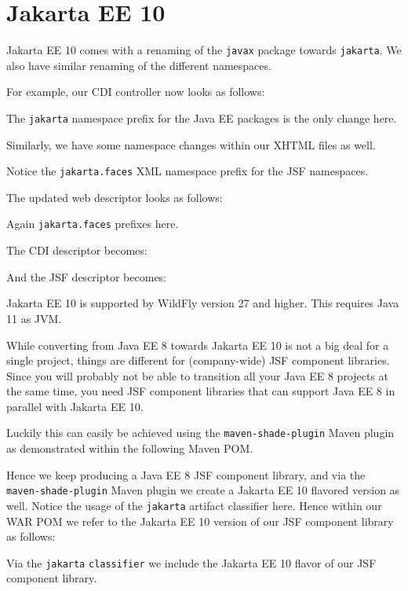 %

\chapter{Jakarta EE 10}

Jakarta EE 10 comes with a renaming of the \texttt{javax} package towards \texttt{jakarta}.
We also have similar renaming of the different namespaces.

For example, our CDI controller now looks as follows:

The \texttt{jakarta} namespace prefix for the Java EE packages is the only change here.

Similarly, we have some namespace changes within our XHTML files as well.

Notice the \texttt{jakarta.faces} XML namespace prefix for the JSF namespaces.

The updated web descriptor looks as follows:

Again \texttt{jakarta.faces} prefixes here.

The CDI descriptor becomes:

And the JSF descriptor becomes:


Jakarta EE 10 is supported by WildFly version 27 and higher.
This requires Java 11 as JVM.

While converting from Java EE 8 towards Jakarta EE 10 is not a big deal for a single project, things are different for (company-wide) JSF component libraries.
Since you will probably not be able to transition all your Java EE 8 projects at the same time, you need JSF component libraries that can support Java EE 8 in parallel with Jakarta EE 10.

Luckily this can easily be achieved using the \texttt{maven-shade-plugin} Maven plugin as demonstrated within the following Maven POM.

Hence we keep producing a Java EE 8 JSF component library, and via the \texttt{maven-shade-plugin} Maven plugin we create a Jakarta EE 10 flavored version as well.
Notice the usage of the \texttt{jakarta} artifact classifier here.
Hence within our WAR POM we refer to the Jakarta EE 10 version of our JSF component library as follows:

Via the \texttt{jakarta} \texttt{classifier} we include the Jakarta EE 10 flavor of our JSF component library.